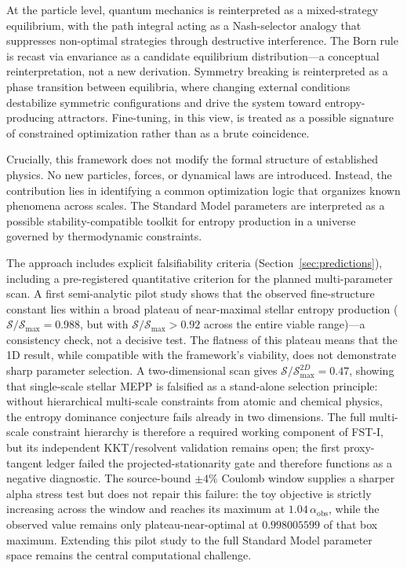 \documentclass[12pt,a4paper]{article}
\theoremstyle{remark}
\begin{document}
At the particle level, quantum mechanics is reinterpreted as a mixed-strategy equilibrium, with the path integral acting as a Nash-selector analogy that suppresses non-optimal strategies through destructive interference. The Born rule is recast via envariance as a candidate equilibrium distribution---a conceptual reinterpretation, not a new derivation. Symmetry breaking is reinterpreted as a phase transition between equilibria, where changing external conditions destabilize symmetric configurations and drive the system toward entropy-producing attractors. Fine-tuning, in this view, is treated as a possible signature of constrained optimization rather than as a brute coincidence.

Crucially, this framework does not modify the formal structure of established physics. No new particles, forces, or dynamical laws are introduced. Instead, the contribution lies in identifying a common optimization logic that organizes known phenomena across scales. The Standard Model parameters are interpreted as a possible stability-compatible toolkit for entropy production in a universe governed by thermodynamic constraints.

The approach includes explicit falsifiability criteria (Section~\ref{sec:predictions}), including a pre-registered quantitative criterion for the planned multi-parameter scan. A first semi-analytic pilot study shows that the observed fine-structure constant lies within a broad plateau of near-maximal stellar entropy production ($\mathcal{S}/\mathcal{S}_{\max} = 0.988$, but with $\mathcal{S}/\mathcal{S}_{\max} > 0.92$ across the entire viable range)---a consistency check, not a decisive test. The flatness of this plateau means that the 1D result, while compatible with the framework's viability, does not demonstrate sharp parameter selection. A two-dimensional scan gives $\mathcal{S}/\mathcal{S}_{\max}^{2D} = 0.47$, showing that single-scale stellar MEPP is falsified as a stand-alone selection principle: without hierarchical multi-scale constraints from atomic and chemical physics, the entropy dominance conjecture fails already in two dimensions. The full multi-scale constraint hierarchy is therefore a required working component of FST-I, but its independent KKT/resolvent validation remains open; the first proxy-tangent ledger failed the projected-stationarity gate and therefore functions as a negative diagnostic. The source-bound $\pm4\%$ Coulomb window supplies a sharper alpha stress test but does not repair this failure: the toy objective is strictly increasing across the window and reaches its maximum at $1.04\,\alpha_{\mathrm{obs}}$, while the observed value remains only plateau-near-optimal at $0.998005599$ of that box maximum. Extending this pilot study to the full Standard Model parameter space remains the central computational challenge.
\end{document}
